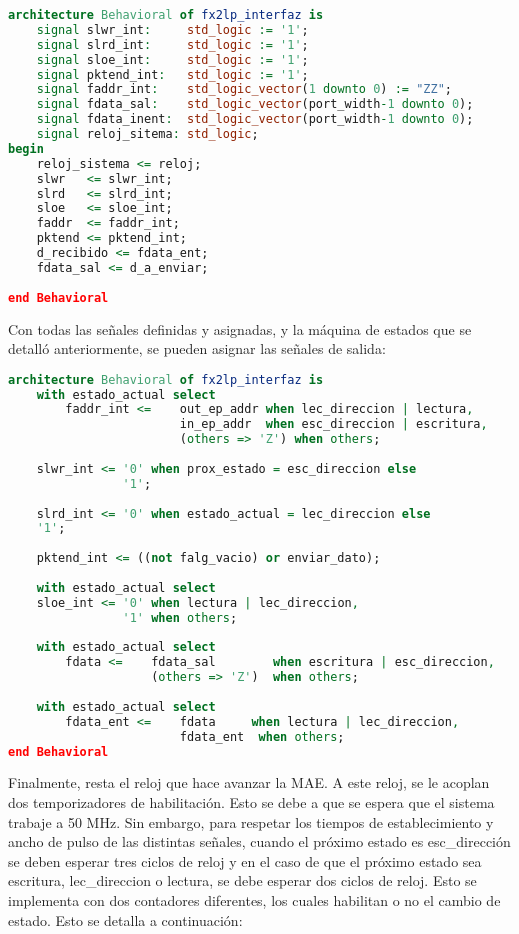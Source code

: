\begin{lstlisting}[language=VHDL,backgroundcolor=\color{gray!30}]
architecture Behavioral of fx2lp_interfaz is
	signal slwr_int:  	 std_logic := '1';
	signal slrd_int:  	 std_logic := '1';
	signal sloe_int:  	 std_logic := '1';
	signal pktend_int:	 std_logic := '1';
	signal faddr_int:	 std_logic_vector(1 downto 0) := "ZZ";
	signal fdata_sal:	 std_logic_vector(port_width-1 downto 0);
	signal fdata_inent:	 std_logic_vector(port_width-1 downto 0);
	signal reloj_sitema: std_logic;
begin
	reloj_sistema <= reloj;
	slwr   <= slwr_int;
	slrd   <= slrd_int;
	sloe   <= sloe_int;
	faddr  <= faddr_int;
	pktend <= pktend_int;
	d_recibido <= fdata_ent;
	fdata_sal <= d_a_enviar;
	
end Behavioral
\end{lstlisting}

Con todas las señales definidas y asignadas, y la máquina de estados que se detalló anteriormente, se pueden asignar las señales de salida:

\begin{lstlisting}[language=VHDL,backgroundcolor=\color{gray!30}]
architecture Behavioral of fx2lp_interfaz is
	with estado_actual select
		faddr_int <=	out_ep_addr when lec_direccion | lectura,
						in_ep_addr  when esc_direccion | escritura,
						(others => 'Z') when others;
	
	slwr_int <=	'0' when prox_estado = esc_direccion else
				'1';
	
	slrd_int <= '0' when estado_actual = lec_direccion else
	'1';
	
	pktend_int <= ((not falg_vacio) or enviar_dato);
	
	with estado_actual select
	sloe_int <=	'0' when lectura | lec_direccion,
				'1' when others;
	
	with estado_actual select
		fdata <=	fdata_sal        when escritura | esc_direccion,
					(others => 'Z')  when others;
	
	with estado_actual select
		fdata_ent <=	fdata     when lectura | lec_direccion,
						fdata_ent  when others;
end Behavioral
\end{lstlisting}

Finalmente, resta el reloj que hace avanzar la MAE. A este reloj, se le acoplan dos temporizadores de habilitación. Esto se debe a que se espera que el sistema trabaje a 50 MHz. Sin embargo, para respetar los tiempos de establecimiento y ancho de pulso de las distintas señales\cite{Cypress2017}, cuando el próximo estado es esc\_dirección se deben esperar tres ciclos de reloj y en el caso de que el próximo estado sea escritura, lec\_direccion o lectura, se debe esperar dos ciclos de reloj.
Esto se implementa con dos contadores diferentes, los cuales habilitan o no el cambio de estado. Esto se detalla a continuación:


